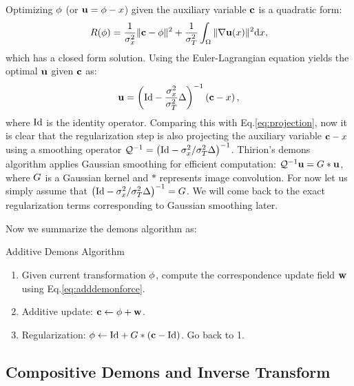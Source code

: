 \documentclass[letterpaper,12pt]{article}
\begin{document}
Optimizing $\phi$ (or $\mathbf{u} = \phi - x$) given the auxiliary variable $\mathbf{c}$ is a quadratic form: 
\begin{align}
R(\phi) = \frac{1}{\sigma_x^2} \|\mathbf{c} - \phi\|^2+\frac{1}{\sigma_T^2} \int_\Omega \| \nabla\mathbf{u}(x)\|^2 \text{d} x,
\end{align}
which has a closed form solution.  Using the Euler-Lagrangian equation yields the optimal $\mathbf{u}$ given $\mathbf{c}$ as:
\begin{align}
\mathbf{u} = \left( \text{Id} - \frac{\sigma_x^2}{\sigma_T^2} \Delta \right)^{-1} \left( \mathbf{c} - x \right),
\end{align}
where $\text{Id}$ is the identity operator. Comparing this with
Eq.\ref{eq:projection}, now it is clear that the regularization step
is also projecting the auxiliary variable $\mathbf{c}-x$ using a smoothing
operator  $\mathcal{Q}^{-1} = \left( \text{Id} - {\sigma_x^2}/{\sigma_T^2} \Delta \right)^{-1}$. 
Thirion's demons algorithm applies Gaussian smoothing for efficient
computation: $\mathcal{Q}^{-1} \mathbf{u} = {G} \ast \mathbf{u}$, where ${G}$ is a Gaussian
kernel and $\ast$ represents image convolution. For now let us simply
assume that $\left( \text{Id} - {\sigma_x^2}/{\sigma_T^2} \Delta \right)^{-1} =
{G}$.  We will come back to the exact regularization terms corresponding to Gaussian smoothing later.

Now we summarize the demons algorithm as:
\begin{algorithm}
\caption{Additive Demons Algorithm}
\label{alg:additivedemons}
\begin{enumerate}
\item{Given current transformation $\phi$, compute the correspondence update field $\mathbf{w}$ using Eq.\ref{eq:adddemonforce}. 
}
\item{Additive update: $\mathbf{c} \leftarrow \phi + \mathbf{w}$.
}
\item{Regularization: $\phi \leftarrow \text{Id} + {G} \ast (\mathbf{c} - \text{Id})$. Go back to 1.
}
\end{enumerate}
\end{algorithm}

\subsection{Compositive Demons and Inverse Transform}
\end{document}
